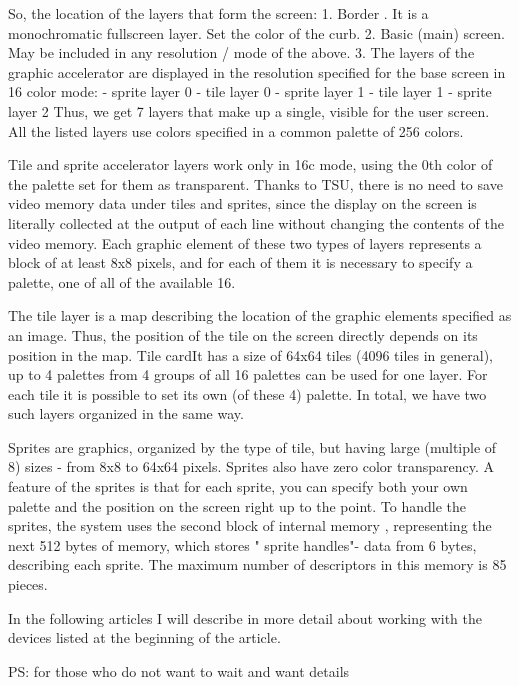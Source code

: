 So, the location of the layers that form the screen: 
1. Border . It is a monochromatic fullscreen layer. Set the color of the curb. 
2. Basic (main) screen. May be included in any resolution / mode of the above. 
3. The layers of the graphic accelerator are displayed in the resolution specified for the base screen in 16 color mode: 
- sprite layer 0 
- tile layer 0 
- sprite layer 1 
- tile layer 1 
- sprite layer 2 
Thus, we get 7 layers that make up a single, visible for the user screen.
All the listed layers use colors specified in a common palette of 256 colors.

Tile and sprite accelerator layers work only in 16c mode, using the 0th color of the palette set for them as transparent. Thanks to TSU, there is no need to save video memory data under tiles and sprites, since the display on the screen is literally collected at the output of each line without changing the contents of the video memory. 
Each graphic element of these two types of layers represents a block of at least 8x8 pixels, and for each of them it is necessary to specify a palette, one of all of the available 16. 

The tile layer is a map describing the location of the graphic elements specified as an image. Thus, the position of the tile on the screen directly depends on its position in the map. 
Tile cardIt has a size of 64x64 tiles (4096 tiles in general), up to 4 palettes from 4 groups of all 16 palettes can be used for one layer. For each tile it is possible to set its own (of these 4) palette. 
In total, we have two such layers organized in the same way. 

Sprites are graphics, organized by the type of tile, but having large (multiple of 8) sizes - from 8x8 to 64x64 pixels. Sprites also have zero color transparency. 
A feature of the sprites is that for each sprite, you can specify both your own palette and the position on the screen right up to the point. 
To handle the sprites, the system uses the second block of internal memory , representing the next 512 bytes of memory, which stores " sprite handles"- data from 6 bytes, describing each sprite. The maximum number of descriptors in this memory is 85 pieces. 

In the following articles I will describe in more detail about working with the devices listed at the beginning of the article. 

PS: for those who do not want to wait and want details
